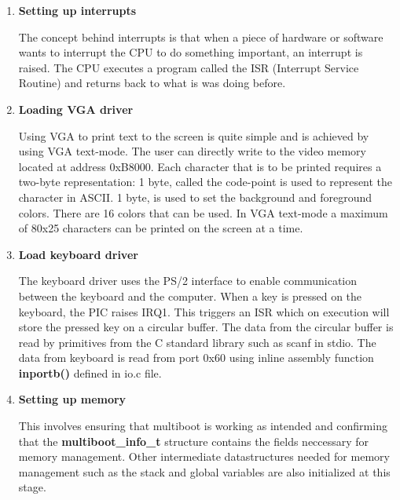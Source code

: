 \begin{enumerate}

	\item \textbf{Setting up interrupts}
	\begin{flushleft}
		The concept behind interrupts is that when a piece of hardware or software wants to
		interrupt the CPU to do something important, an interrupt is raised. The CPU
		executes a program called the ISR (Interrupt Service Routine) and returns back to
		what is was doing before.
	\end{flushleft}

	\item \textbf{Loading VGA driver}
	\begin{flushleft}
		Using VGA to print text to the screen is quite simple and is achieved by using
		VGA text-mode. The user can directly write to the video memory located at
		address 0xB8000. Each character that is to be printed requires a two-byte
		representation:
		1 byte, called the code-point is used to represent the character in ASCII.
		1 byte, is used to set the background and foreground colors. There are 16
		colors that can be used.
		In VGA text-mode a maximum of 80x25 characters can be printed on the
		screen at a time.
	\end{flushleft}

	\item \textbf{Load keyboard driver}
	\begin{flushleft}
		The keyboard driver uses the PS/2 interface to enable communication between the keyboard and the computer. When a key is pressed 
		on the keyboard, the PIC raises IRQ1. This triggers an ISR which on execution will store the pressed key on a circular buffer.
		The data from the circular buffer is read by primitives from the C standard library such as scanf in stdio. The data from keyboard is
		read from port 0x60 using inline assembly function \textbf{inportb()} defined in io.c file.
	\end{flushleft}

	\item \textbf{Setting up memory}
	\begin{flushleft}
		This involves ensuring that multiboot is working as intended and confirming that the 
		\textbf{multiboot\_info\_t} structure contains the fields neccessary for memory management.
		 Other intermediate datastructures needed for memory management such as the stack and global variables
		are also initialized at this stage.
	\end{flushleft}
\end{enumerate}

